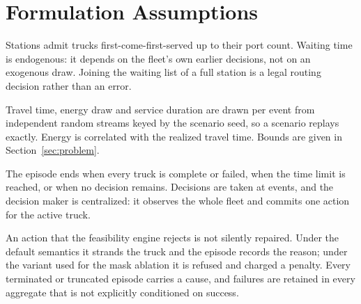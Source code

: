 \documentclass[a4paper,fleqn]{cas-sc}
\begin{document}
\section{Formulation Assumptions}\label{app:assumptions}

\begin{description}[leftmargin=*,nosep]
\item[Queueing.] Stations admit trucks first-come-first-served up to their port
count. Waiting time is endogenous: it depends on the fleet's own earlier
decisions, not on an exogenous draw. Joining the waiting list of a full station
is a legal routing decision rather than an error.
\item[Uncertainty.] Travel time, energy draw and service duration are drawn per
event from independent random streams keyed by the scenario seed, so a scenario
replays exactly. Energy is correlated with the realized travel time. Bounds are
given in Section~\ref{sec:problem}.
\item[Horizon and information.] The episode ends when every truck is complete or
failed, when the time limit is reached, or when no decision remains. Decisions
are taken at events, and the decision maker is centralized: it observes the
whole fleet and commits one action for the active truck.
\item[Fallback.] An action that the feasibility engine rejects is not silently
repaired. Under the default semantics it strands the truck and the episode
records the reason; under the variant used for the mask ablation it is refused
and charged a penalty. Every terminated or truncated episode carries a cause,
and failures are retained in every aggregate that is not explicitly conditioned
on success.
\end{description}







\end{document}
